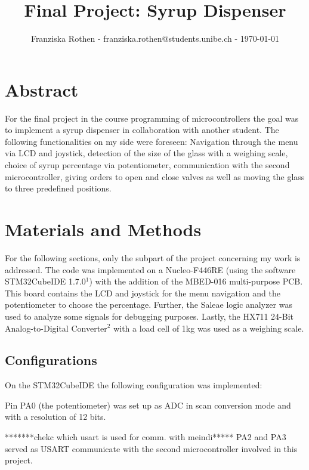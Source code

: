 \documentclass[twocolumn]{article}
\begin{document}
	
	\title{Final Project: Syrup Dispenser}
	
	\author{Franziska Rothen - franziska.rothen@students.unibe.ch - \today}
	
	\maketitle\thispagestyle{empty}
	
	\section*{Abstract}
	For the final project in the course programming of microcontrollers the goal was to implement a syrup dispenser in collaboration with another student. The following functionalities on my side were foreseen: Navigation through the menu via LCD and joystick, detection of the size of the glass with a weighing scale, choice of syrup percentage via potentiometer, communication with the second microcontroller, giving orders to open and close valves as well as moving the glass to three predefined positions. 
	
	\section{Materials and Methods}
	For the following sections, only the subpart of the project concerning my work is addressed.\newline
	The code was implemented on a Nucleo-F446RE (using the software STM32CubeIDE 1.7.0$^1$) with the addition of the MBED-016 multi-purpose PCB. This board contains the LCD and joystick for the menu navigation and the potentiometer to choose the percentage. Further, the Saleae logic analyzer was used to analyze some signals for debugging purposes. Lastly, the HX711 24-Bit Analog-to-Digital Converter$^2$ with a load cell of 1kg was used as a weighing scale.	
	
	\subsection{Configurations}
	On the STM32CubeIDE the following configuration was implemented:
	
	Pin PA0 (the potentiometer) was set up as ADC in scan conversion mode and with a resolution of 12 bits.
	
	*******chekc which usart is used for comm. with meindi***** PA2 and PA3 served as USART communicate with the second microcontroller involved in this project. 
	
\end{document}
